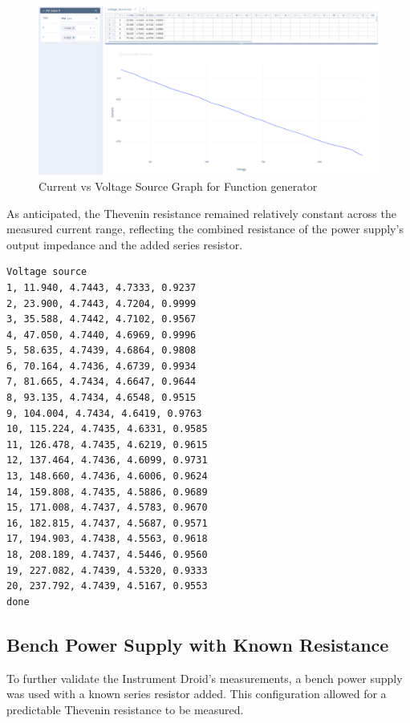 \documentclass[a4paper,11pt]{article}%
\begin{document}
\begin{figure}[H]
	\centering
	\includegraphics[scale=0.30]{figures/vs.png}
  \caption{Current vs Voltage Source Graph for Function generator}
  \label{fig:vs}
\end{figure}

As anticipated, the Thevenin resistance remained relatively constant across the measured current range, reflecting the combined resistance of the power supply's output impedance and the added series resistor.

\begin{lstlisting}
Voltage source
1, 11.940, 4.7443, 4.7333, 0.9237
2, 23.900, 4.7443, 4.7204, 0.9999 
3, 35.588, 4.7442, 4.7102, 0.9567
4, 47.050, 4.7440, 4.6969, 0.9996
5, 58.635, 4.7439, 4.6864, 0.9808
6, 70.164, 4.7436, 4.6739, 0.9934
7, 81.665, 4.7434, 4.6647, 0.9644
8, 93.135, 4.7434, 4.6548, 0.9515
9, 104.004, 4.7434, 4.6419, 0.9763
10, 115.224, 4.7435, 4.6331, 0.9585
11, 126.478, 4.7435, 4.6219, 0.9615
12, 137.464, 4.7436, 4.6099, 0.9731
13, 148.660, 4.7436, 4.6006, 0.9624
14, 159.808, 4.7435, 4.5886, 0.9689
15, 171.008, 4.7437, 4.5783, 0.9670
16, 182.815, 4.7437, 4.5687, 0.9571
17, 194.903, 4.7438, 4.5563, 0.9618
18, 208.189, 4.7437, 4.5446, 0.9560
19, 227.082, 4.7439, 4.5320, 0.9333
20, 237.792, 4.7439, 4.5167, 0.9553
done
\end{lstlisting}

\subsection{Bench Power Supply with Known Resistance} 

To further validate the Instrument Droid's measurements, a bench power supply was used with a known series resistor added. This configuration allowed for a predictable Thevenin resistance to be measured.\\
\end{document}
